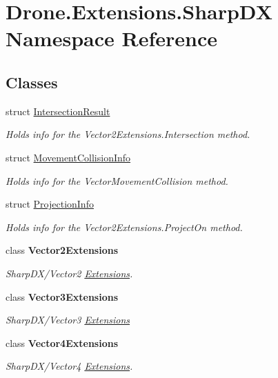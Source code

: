 \hypertarget{namespace_drone_1_1_extensions_1_1_sharp_d_x}{}\section{Drone.\+Extensions.\+Sharp\+D\+X Namespace Reference}
\label{namespace_drone_1_1_extensions_1_1_sharp_d_x}
\subsection*{Classes}
\begin{DoxyCompactItemize}
\item 
struct \hyperlink{struct_drone_1_1_extensions_1_1_sharp_d_x_1_1_intersection_result}{Intersection\+Result}
\begin{DoxyCompactList}\small\item\em Holds info for the Vector2\+Extensions.\+Intersection method. \end{DoxyCompactList}\item 
struct \hyperlink{struct_drone_1_1_extensions_1_1_sharp_d_x_1_1_movement_collision_info}{Movement\+Collision\+Info}
\begin{DoxyCompactList}\small\item\em Holds info for the Vector\+Movement\+Collision method. \end{DoxyCompactList}\item 
struct \hyperlink{struct_drone_1_1_extensions_1_1_sharp_d_x_1_1_projection_info}{Projection\+Info}
\begin{DoxyCompactList}\small\item\em Holds info for the Vector2\+Extensions.\+Project\+On method. \end{DoxyCompactList}\item 
class {\bfseries Vector2\+Extensions}
\begin{DoxyCompactList}\small\item\em Sharp\+D\+X/\+Vector2 \hyperlink{namespace_drone_1_1_extensions}{Extensions}. \end{DoxyCompactList}\item 
class {\bfseries Vector3\+Extensions}
\begin{DoxyCompactList}\small\item\em Sharp\+D\+X/\+Vector3 \hyperlink{namespace_drone_1_1_extensions}{Extensions} \end{DoxyCompactList}\item 
class {\bfseries Vector4\+Extensions}
\begin{DoxyCompactList}\small\item\em Sharp\+D\+X/\+Vector4 \hyperlink{namespace_drone_1_1_extensions}{Extensions}. \end{DoxyCompactList}\end{DoxyCompactItemize}
